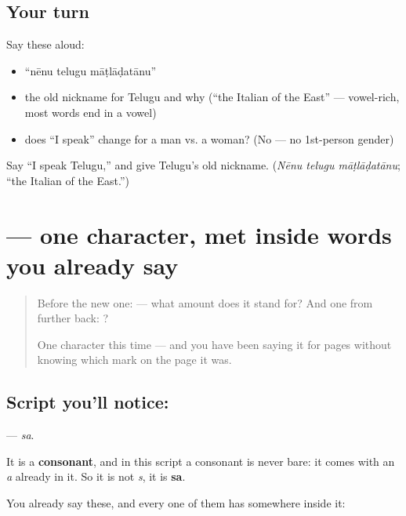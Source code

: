 \subsection*{Your turn}
Say these aloud:

\begin{itemize}
\raggedright
  \item \textquotedblleft{}nēnu telugu māṭlāḍatānu\textquotedblright{}
  \item the old nickname for Telugu and why (\textquotedblleft{}the Italian of the East\textquotedblright{} — vowel-rich, most words end in a vowel)
  \item does \textquotedblleft{}I speak\textquotedblright{} change for a man vs. a woman? (No — no 1st-person gender)
\end{itemize}

\begin{tcolorbox}[breakable,colback=teal!4,colframe=teal!35!black,title={Before you move on}]
Say \textquotedblleft{}I speak Telugu,\textquotedblright{} and give Telugu's old nickname. (\emph{Nēnu telugu māṭlāḍatānu}; \textquotedblleft{}the Italian of the East.\textquotedblright{})
\end{tcolorbox}
\section[\texorpdfstring{\te{స} (sa)}{స (sa)}]{ — one character, met inside words you already say}

\label{lesson:TE-S111-letter-sa}



\begin{quote}
Before the new one:  — what amount does it stand for? And one from further back: ?

One character this time — and you have been saying it for pages without knowing which mark on the page it was.
\end{quote}

\subsection*{Script you'll notice: }
\textbf{} — \emph{sa}.

It is a \textbf{consonant}, and in this script a consonant is never bare: it comes with an \emph{a} already in it. So it is not \emph{s}, it is \textbf{sa}.

You already say these, and every one of them has  somewhere inside it:

